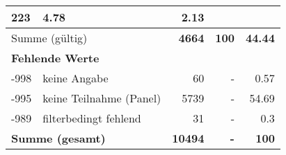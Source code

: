\begin{longtable}{lXrrr}
       \num{223} &
       \num[round-mode=places,round-precision=2]{4.78} &
         \num[round-mode=places,round-precision=2]{2.13} \\
     \midrule
     \multicolumn{2}{l}{Summe (gültig)} &
       \textbf{\num{4664}} &
     \textbf{\num{100}} &
       \textbf{\num[round-mode=places,round-precision=2]{44.44}} \\
     \multicolumn{5}{l}{\textbf{Fehlende Werte}}\\
       -998 &
       keine Angabe &
         \num{60} &
        - &
         \num[round-mode=places,round-precision=2]{0.57} \\
       -995 &
       keine Teilnahme (Panel) &
         \num{5739} &
        - &
         \num[round-mode=places,round-precision=2]{54.69} \\
       -989 &
       filterbedingt fehlend &
         \num{31} &
        - &
         \num[round-mode=places,round-precision=2]{0.3} \\
     \midrule
     \multicolumn{2}{l}{\textbf{Summe (gesamt)}} &
          \textbf{\num{10494}} &
        \textbf{-} &
        \textbf{\num{100}} \\
     \bottomrule
     \end{longtable}
     
